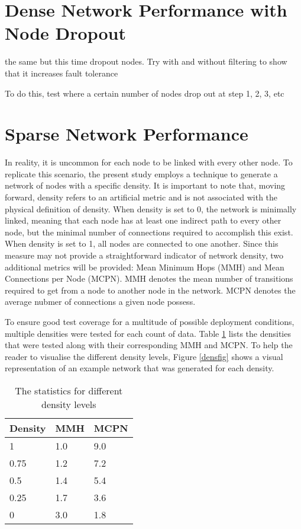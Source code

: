 \section{Dense Network Performance with Node Dropout}


the same but this time dropout nodes. Try with and without filtering to show that it increases fault tolerance

To do this, test where a certain number of nodes drop out at step 1, 2, 3, etc

\section{Sparse Network Performance}
In reality, it is uncommon for each node to be linked with every other node. To replicate this scenario, the present study employs a technique to generate a network of nodes with a specific density. It is important to note that, moving forward, density refers to an artificial metric and is not associated with the physical definition of density. When density is set to 0, the network is minimally linked, meaning that each node has at least one indirect path to every other node, but the minimal number of connections required to accomplish this exist. When density is set to 1, all nodes are connected to one another. Since this measure may not provide a straightforward indicator of network density, two additional metrics will be provided:  Mean Minimum Hops (MMH) and Mean Connections per Node (MCPN). MMH denotes the mean number of transitions required to get from a node to another node in the network. MCPN denotes the average nubmer of connections a given node possess.

To ensure good test coverage for a multitude of possible deployment conditions, multiple densities were tested for each count of data. Table \ref{sparsedensities} lists the densities that were tested along with their corresponding MMH and MCPN. To help the reader to visualise the different density levels, Figure \ref{densfig} shows a visual representation of an example network that was generated for each density.

\begin{table}[H]
	\centering
	\begin{tabular}{l|l|l}
		Density & MMH & MCPN \\ \hline
		1 & 1.0 & 9.0 \\
		0.75    & 1.2 & 7.2  \\
		0.5    & 1.4 & 5.4  \\
		0.25    & 1.7 & 3.6  \\
		0    & 3.0 & 1.8  \\
	\end{tabular}
	\caption{The statistics for different density levels} \label{sparsedensities}
\end{table}

